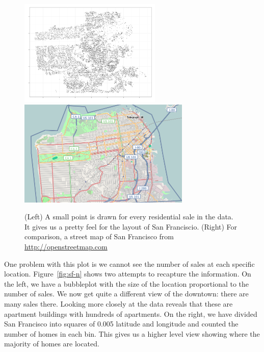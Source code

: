 \documentclass[oneside]{article}
\begin{document}
\begin{figure}[htbp]
  \centering
  \includegraphics[height=2in]{sf-geo}%
  \includegraphics[height=2in]{sf-map}
  \caption{(Left) A small point is drawn for every residential sale in the data.  It gives us a pretty feel for the layout of San Franciscio. (Right) For comparison, a street map of San Francisco from \url{http://openstreetmap.com}}
  \label{fig:sf-geo}
\end{figure}

One problem with this plot is we cannot see the number of sales at each specific location. Figure~\ref{fig:sf-n} shows two attempts to recapture the information. On the left, we have a bubbleplot with the size of the location proportional to the number of sales. We now get quite a different view of the downtown: there are many sales there. Looking more closely at the data reveals that these are apartment buildings with hundreds of apartments. On the right, we have divided San Francisco into squares of 0.005 latitude and longitude and counted the number of homes in each bin. This gives us a higher level view showing where the majority of homes are located.
\end{document}
